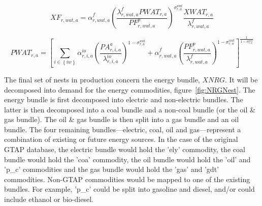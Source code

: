 \documentclass[11pt,letterpaper]{report}
\begin{document}
\begin{equation}
\label{eq:h2oD}
\mathit{XF}_{r,\mathit{wat},a} =
   \alpha^{\mathit{f}}_{r,\mathit{wat},a}
   \left( \frac {\lambda^{f}_{r,\mathit{wat},a} \mathit{PWAT}_{r,a}}
      {\mathit{PF}^p_{r,\mathit{wat},a}}
   \right)^{\sigma^{\mathit{wat}}_{r,a}}
   \frac {\mathit{XWAT}_{r,a}} {\lambda^{f}_{\mathit{r,\mathit{wat},a}}}
\end{equation}

\begin{equation}
\label{eq:pwat}
\mathit{PWAT}_{r,a} =
   \left[
      \sum_{i \in \left\{ \mathit{iw} \right\}} {
         \alpha^{\mathit{io}}_{r,i,a}
         \left( \frac {\mathit{PA}^a_{r,i,a}} {\lambda^{\mathit{io}}_{r,i,a}}
         \right)^{1 - \sigma^{\mathit{wat}}_{\mathit{r,a}}}
      }
   +  \alpha^{\mathit{f}}_{r,\mathit{wat},a}
      \left( \frac {\mathit{PF}^p_{r,\mathit{wat},a}}
         {\lambda^{\mathit{f}}_{r,\mathit{wat},a}}
      \right)^{1 - \sigma^{\mathit{wat}}_{\mathit{r,a}}}
   \right]^{\frac{1} {1 - \sigma^{\mathit{wat}}_{\mathit{r,a}}}}
\end{equation}

The final set of nests in production concern the energy bundle, $\mathit{XNRG}$.
It will be decomposed into demand for the energy commodities,
figure~\ref{fig:NRGNest}. The energy bundle is first decomposed into electric
and non-electric bundles. The latter is then decomposed into a coal bundle and a
non-coal bundle (or the oil \& gas bundle). The oil \& gas bundle is then split
into a gas bundle and an oil bundle. The four remaining bundles---electric,
coal, oil and gas---represent a combination of existing or future energy
sources. In the case of the original GTAP database, the electric bundle would
hold the 'ely' commodity, the coal bundle would hold the 'coa' commodity, the
oil bundle would hold the 'oil' and 'p\_c' commodities and the gas bundle would
hold the 'gas' and 'gdt' commodities. Non-GTAP commodities would be mapped to
one of the existing bundles. For example, 'p\_c' could be split into gasoline
and diesel, and/or could include ethanol or bio-diesel.
\end{document}
